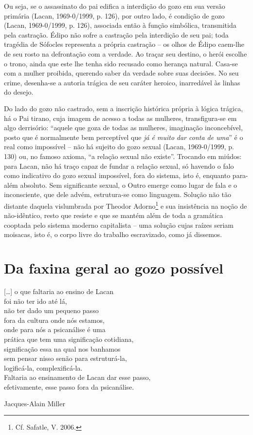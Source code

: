 Ou seja, se o assassinato do pai edifica a interdição do gozo em sua
versão primária (Lacan, 1969-0/1999, p. 126), por outro lado, é condição
de gozo (Lacan, 1969-0/1999, p. 126), associada então à função
simbólica, transmitida pela castração. Édipo não sofre a castração pela
interdição de seu pai; toda tragédia de Sófocles representa a própria
castração -- os olhos de Édipo caem-lhe de seu rosto na defrontação com
a verdade. Ao traçar seu destino, o herói escolhe o trono, ainda que
este lhe tenha sido recusado como herança natural. Casa-se com a mulher
proibida, querendo saber da verdade sobre suas decisões. No seu crime,
desenha-se a autoria trágica de seu caráter heroico, inarredável às
linhas do desejo.

Do lado do gozo não castrado, sem a inscrição histórica própria à lógica
trágica, há o Pai tirano, cuja imagem de acesso a todas as mulheres,
transfigura-se em algo derrisório: ``aquele que goza de todas as
mulheres, imaginação inconcebível, posto que é normalmente bem
perceptível que \emph{já é muito} \emph{dar conta de uma}'' é o real
como impossível -- não há sujeito do gozo sexual (Lacan, 1969-0/1999, p.
130) ou, no famoso axioma, ``a relação sexual não existe''. Trocando em
miúdos: para Lacan, não há traço capaz de fundar a relação sexual, só
havendo o falo como indicativo do gozo sexual impossível, fora do
sistema, isto é, enquanto para-além absoluto. Sem significante sexual, o
Outro emerge como lugar de fala e o inconsciente, que dele advém,
estrutura-se como linguagem. Solução não tão distante daquela
vislumbrada por Theodor Adorno\footnote{Cf. Safatle, V. 2006.} e sua
insistência na noção de não-idêntico, resto que resiste e que se mantém
além de toda a gramática cooptada pelo sistema moderno capitalista --
uma solução cujas raízes seriam moisacas, isto é, o corpo livre do
trabalho escravizado, como já dissemos.

\section{Da faxina geral ao gozo possível}

\epigraph{{[}\ldots{}{]} o que faltaria ao ensino de Lacan\\
foi não ter ido até lá,\\
não ter dado um pequeno passo\\
fora da cultura onde nós estamos,\\
onde para nós a psicanálise é uma\\
prática que tem uma significação cotidiana,\\
significação essa na qual nos banhamos\\
sem pensar nisso senão para estruturá-la,\\
logificá-la, complexificá-la.\\
Faltaria ao ensinamento de Lacan dar esse passo,\\
efetivamente, esse passo fora da psicanálise.}{Jacques-Alain Miller}

